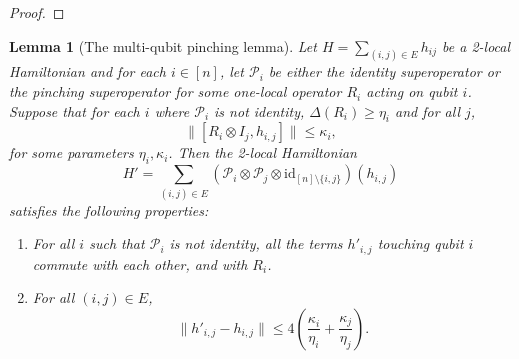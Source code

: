 \documentclass[11pt]{article}
\theoremstyle{plain}
\newtheorem{lemma}[theorem]{Lemma}
\newcommand{\IslamNote}[1]{\textcolor{orange}{(Islam: #1)}}
\newcommand{\IslamNote}[1]{}
\renewcommand{\cP}{\mathcal{P}}
\begin{document}
\begin{proof}



\end{proof}

\begin{lemma}[The multi-qubit pinching lemma]\label{lemma:double-extra-cheese}
    Let $H = \sum_{(i,j) \in E} h_{ij}$ be a 2-local Hamiltonian and for each $i \in [n]$, let $\mathcal{P}_i$ be either the identity superoperator or the pinching superoperator for some one-local operator $R_i$ acting on qubit $i$. Suppose that for each $i$ where $\mathcal{P}_i$ is not identity, $\Delta(R_i) \geq \eta_i$ and for all $j$, 
    \[ \|[R_i \otimes I_j, h_{i,j} ] \| \leq \kappa_i,\]
    for some parameters $\eta_i, \kappa_i$.
    Then the 2-local Hamiltonian
    \begin{equation}\label{eqn:definition-of-H-prime}
        H' = \sum_{(i,j) \in E} (\cP_i \otimes \cP_j \otimes \mathrm{id}_{[n]\setminus \{i,j\}})( h_{i,j})
    \end{equation}
    satisfies the following properties:
    \begin{enumerate}
        \item For all $i$ such that $\cP_i$ is not identity, all the terms $h'_{i,j}$ touching qubit $i$ commute with each other, and with $R_i$.
        \item For all $(i,j) \in E$,
        \begin{equation} \| h'_{i,j} - h_{i,j} \| \leq 4 \left(\frac{\kappa_i}{\eta_i} +  \frac{\kappa_j}{\eta_j}\right). \label{eq:cheese-rounding-error} \end{equation}
    \end{enumerate}
\end{lemma}
\end{document}
